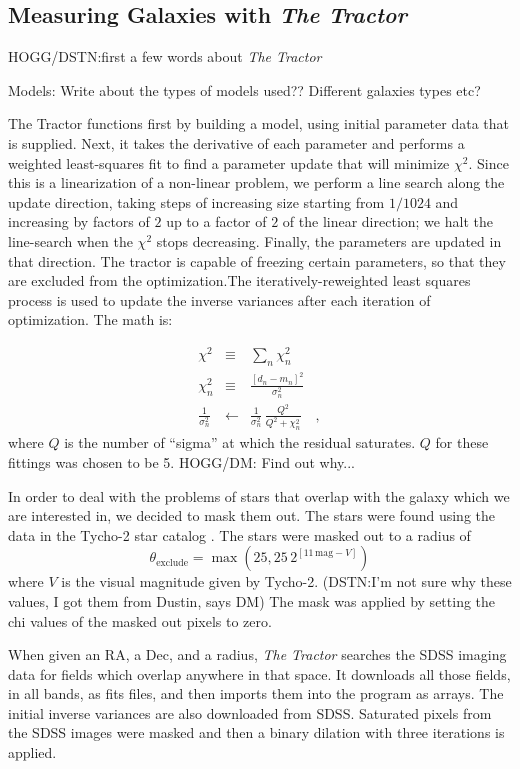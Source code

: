 \documentclass[12pt,preprint,pdftex]{aastex}
\newcommand{\project}[1]{\textsl{#1}}
\newcommand{\units}[1]{\mathrm{#1}}
\renewcommand{\mag}{\units{mag}}
\begin{document}
\subsection{Measuring Galaxies with \emph{The Tractor}} 

HOGG/DSTN:first a few words about \project{The Tractor}

Models: Write about the types of models used?? Different galaxies
types etc?  

The Tractor functions first by building a model, using
initial parameter data that is supplied. Next, it takes the derivative
of each parameter and performs a weighted least-squares fit to find a
parameter update that will minimize $\chi^2$.  Since this is a
linearization of a non-linear problem, we perform a line search along
the update direction, taking steps of increasing size starting from
$1/1024$ and increasing by factors of $2$ up to a factor of $2$ of the
linear direction; we halt the line-search when the $\chi^2$ stops
decreasing.  Finally, the parameters are updated in that direction. The
tractor is capable of freezing certain parameters, so that they are
excluded from the optimization.The iteratively-reweighted least
squares process is used to update the inverse variances after each
iteration of optimization. The math is:

\begin{eqnarray}
\chi^2 &\equiv& \sum_n \chi_n^2
\\
\chi_n^2 &\equiv& \frac{[d_n - m_n]^2}{\sigma_n^2}
\\
\frac{1}{\sigma_n^2} &\leftarrow& \frac{1}{\sigma_n^2}\,\frac{Q^2}{Q^2+\chi_n^2}
\quad ,
\end{eqnarray}
where $Q$ is the number of ``sigma'' at which the residual saturates. $Q$ for these fittings was chosen to be 5. HOGG/DM: Find out why...

In order to deal with the problems of stars that overlap with the
galaxy which we are interested in, we decided to mask them out. The
stars were found using the data in the Tycho-2 star catalog \citep{tycho2}.
The stars were masked out to a
radius of
\begin{equation}
\theta_{\mathrm{exclude}} = \max(25, 25\,2^{[11\,\mag-V]})
\end{equation}
where $V$ is the visual magnitude given by Tycho-2.
(DSTN:I'm not sure why these values, I got them from Dustin, says DM) The mask was applied by setting the chi values of the masked out pixels to zero.

When given an RA, a Dec, and a radius, \emph{The Tractor} searches the SDSS imaging
data for fields which overlap anywhere in that space. It downloads all
those fields, in all bands, as fits files, and then imports them into
the program as arrays. The initial inverse variances are also
downloaded from SDSS.  Saturated pixels from the SDSS images were
masked and then a binary dilation with three iterations is
applied.
\end{document}
